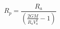 \begin{equation*}
R_{p} = \frac{R_{a}}{\left(\frac{2GM}{R_{a}V_{a}^2} - 1 \right)} \tag{4.19}
\end{equation*}
